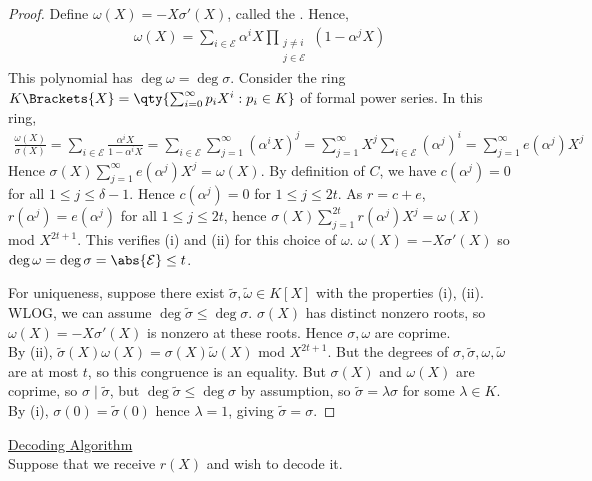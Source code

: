 \begin{proof}
    Define $\omega(X) = -X\sigma'(X)$, called the .
    Hence,
    \begin{align*}
        \omega(X) = \sum_{i \in \mathcal E} \alpha^i X \prod_{\substack{j \neq i \\ j \in \mathcal{E}}} (1 - \alpha^j X)
    \end{align*}
    This polynomial has $\deg \omega = \deg \sigma$.
    Consider the ring $K\Brackets{X} = \qty{\sum_{i=0}^{\infty} p_i X^i : p_i \in K}$ of formal power series.
    In this ring,
    \begin{align*}
        \frac{\omega(X)}{\sigma(X)} = \sum_{i \in \mathcal E} \frac{\alpha^i X}{1 - \alpha^i X} = \sum_{i \in \mathcal E} \sum_{j = 1}^\infty (\alpha^i X)^j = \sum_{j=1}^\infty X^j \sum_{i \in \mathcal E} (\alpha^j)^i = \sum_{j=1}^\infty e(\alpha^j) X^j
    \end{align*}
    Hence $\sigma(X) \sum_{j=1}^\infty e(\alpha^j) X^j = \omega(X)$.
    By definition of $C$, we have $c(\alpha^j) = 0$ for all $1 \leq j \leq \delta - 1$.
    Hence $c(\alpha^j) = 0$ for $1 \leq j \leq 2t$.
    As $r = c + e$, $r(\alpha^j) = e(\alpha^j)$ for all $1 \leq j \leq 2t$, hence $\sigma(X) \sum_{j=1}^{2t} r(\alpha^j) X^j = \omega(X)$ mod $X^{2t+1}$.
    This verifies (i) and (ii) for this choice of $\omega$.
    $\omega(X) = -X\sigma'(X)$ so $\deg \omega = \deg \sigma = \abs{\mathcal E} \leq t$.

    For uniqueness, suppose there exist $\widetilde \sigma, \widetilde \omega \in K[X]$ with the properties (i), (ii).
    WLOG, we can assume $\deg \widetilde \sigma \leq \deg \sigma$.
    $\sigma(X)$ has distinct nonzero roots, so $\omega(X) = -X\sigma'(X)$ is nonzero at these roots.
    Hence $\sigma, \omega$ are coprime. \\
    By (ii), $\widetilde \sigma(X) \omega(X) = \sigma(X) \widetilde \omega(X)$ mod $X^{2t+1}$.
    But the degrees of $\sigma, \widetilde \sigma, \omega, \widetilde \omega$ are at most $t$, so this congruence is an equality.
    But $\sigma(X)$ and $\omega(X)$ are coprime, so $\sigma \mid \widetilde \sigma$, but $\deg \widetilde \sigma \leq \deg \sigma$ by assumption, so $\widetilde \sigma = \lambda \sigma$ for some $\lambda \in K$.
    By (i), $\sigma(0) = \widetilde\sigma(0)$ hence $\lambda = 1$, giving $\widetilde \sigma = \sigma$.
\end{proof}

\underline{Decoding Algorithm} \\
Suppose that we receive $r(X)$ and wish to decode it.


